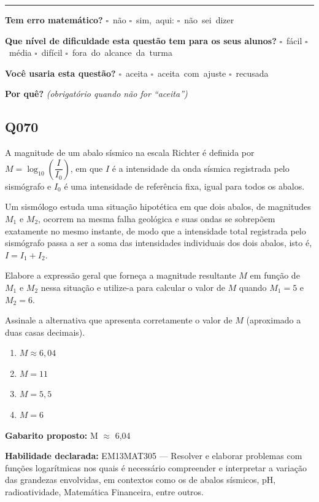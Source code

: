 \documentclass[11pt,a4paper]{article}
\begin{document}
\noindent\rule{\linewidth}{0.4pt}
\textbf{Tem erro matemático?}\quad
\mbox{$\square$~não} \quad \mbox{$\square$~sim, aqui:} \underline{\hspace{5cm}}
\quad \mbox{$\square$~não sei dizer}

\textbf{Que nível de dificuldade esta questão tem para os seus alunos?}\quad
\mbox{$\square$~fácil} \quad \mbox{$\square$~média} \quad
\mbox{$\square$~difícil} \quad \mbox{$\square$~fora do alcance da turma}

\textbf{Você usaria esta questão?}\quad
\mbox{$\square$~aceita} \quad \mbox{$\square$~aceita com ajuste} \quad
\mbox{$\square$~recusada}

\textbf{Por quê?} \emph{(obrigatório quando não for ``aceita'')}

\underline{\hspace{\linewidth}}

\underline{\hspace{\linewidth}}
\vspace{0.6em}

\begin{samepage}
\subsection*{Q070}
A magnitude de um abalo sísmico na escala Richter é definida por $M = \log_{10}\left(\dfrac{I}{I_0}\right)$, em que $I$ é a intensidade da onda sísmica registrada pelo sismógrafo e $I_0$ é uma intensidade de referência fixa, igual para todos os abalos.

Um sismólogo estuda uma situação hipotética em que dois abalos, de magnitudes $M_1$ e $M_2$, ocorrem na mesma falha geológica e suas ondas se sobrepõem exatamente no mesmo instante, de modo que a intensidade total registrada pelo sismógrafo passa a ser a soma das intensidades individuais dos dois abalos, isto é, $I = I_1 + I_2$.

Elabore a expressão geral que forneça a magnitude resultante $M$ em função de $M_1$ e $M_2$ nessa situação e utilize-a para calcular o valor de $M$ quando $M_1 = 5$ e $M_2 = 6$.

Assinale a alternativa que apresenta corretamente o valor de $M$ (aproximado a duas casas decimais).
\begin{enumerate}[label=(\alph*),nosep,leftmargin=*]
\item $M \approx 6{,}04$
\item $M = 11$
\item $M = 5{,}5$
\item $M = 6$
\end{enumerate}

\textbf{Gabarito proposto:} M $\approx$ 6,04

\textbf{Habilidade declarada:} EM13MAT305 --- Resolver e elaborar problemas com funções logarítmicas nos quais é necessário compreender e interpretar a variação das grandezas envolvidas, em contextos como os de abalos sísmicos, pH, radioatividade, Matemática Financeira, entre outros.
\end{samepage}
\end{document}
